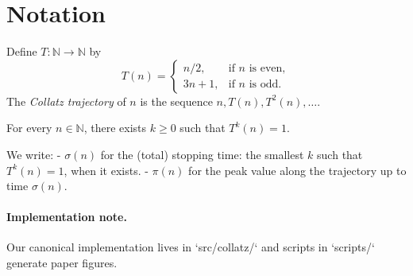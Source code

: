 \section{Notation}

\begin{definition}
Define $T:\mathbb{N}\to\mathbb{N}$ by
\[
T(n) =
\begin{cases}
  n/2, & \text{if $n$ is even},\\
  3n+1, & \text{if $n$ is odd}.
\end{cases}
\]
The \emph{Collatz trajectory} of $n$ is the sequence $n, T(n), T^{2}(n), \dots$.
\end{definition}

\begin{conjecture}[Collatz]
For every $n\in\mathbb{N}$, there exists $k\ge 0$ such that $T^{k}(n)=1$.
\end{conjecture}

We write:
- $\sigma(n)$ for the (total) stopping time: the smallest $k$ such that $T^{k}(n)=1$, when it exists.
- $\pi(n)$ for the peak value along the trajectory up to time $\sigma(n)$.

\paragraph{Implementation note.}
Our canonical implementation lives in `src/collatz/` and scripts in `scripts/` generate paper figures.
